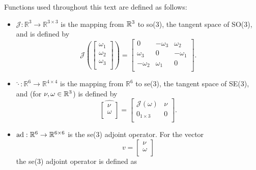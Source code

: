 \noindent Functions used throughout this text are defined as follows:
%
\begin{itemize}
\item $\mathcal{J}:\mathbb{R}^3\to\mathbb{R}^{3\times 3}$ is
the mapping from $\mathbb{R}^{3}$ to so(3), the tangent space of SO(3),
and is defined by
%
\begin{equation}
\mathcal{J}\left(
\left[ \begin{array}{c} 
\omega_1 \\\omega_2  \\ \omega_3 \\
\end{array} \right]\right) =
\left[ \begin{array}{ccc}
     0     & -\omega_3 &  \omega_2                               \\
   \omega_3  &    0    & -\omega_1                               \\
  -\omega_2  &  \omega_1 &    0                                  \\
\end{array} \right].
\end{equation}
%
%
\item $\widehat{\cdot}:\mathbb{R}^6\to\mathbb{R}^{4\times 4}$ is the
  mapping from $\mathbb{R}^6$ to se(3), the tangent space of SE(3),
  and (for $\nu,\omega\in\mathbb{R}^{3}$) is defined by
%
\begin{equation}
\widehat{
\left[ \begin{array}{c} 
\nu \\ \omega  \\
\end{array} \right] } =
\left[ \begin{array}{cc}
     \mathcal{J}(\omega) & \nu        \\
        0_{1 \times 3}     &  0         \\
\end{array} \right].
\end{equation}
%
%
\item $\operatorname{ad}:\mathbb{R}^6\to\mathbb{R}^{6\times 6}$ is the se(3) adjoint
operator. For the vector 
%
\begin{equation}
v=\left[ \begin{array}{c} 
\nu \\ \omega  \\
\end{array} \right]
\end{equation} 
%
the se(3) adjoint operator is defined as
%
\begin{equation}

\end{equation}
\end{itemize}
